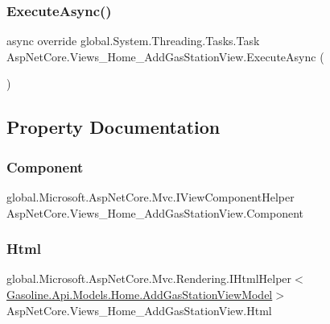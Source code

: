 \subsubsection{\texorpdfstring{ExecuteAsync()}{ExecuteAsync()}}
{\footnotesize\ttfamily async override global.\+System.\+Threading.\+Tasks.\+Task Asp\+Net\+Core.\+Views\+\_\+\+Home\+\_\+\+Add\+Gas\+Station\+View.\+Execute\+Async (\begin{DoxyParamCaption}{ }\end{DoxyParamCaption})}



\subsection{Property Documentation}
\mbox{\label{class_asp_net_core_1_1_views___home___add_gas_station_view_abbe0887258cdb2477dac740d2f7651c0}} 
\subsubsection{\texorpdfstring{Component}{Component}}
{\footnotesize\ttfamily global.\+Microsoft.\+Asp\+Net\+Core.\+Mvc.\+I\+View\+Component\+Helper Asp\+Net\+Core.\+Views\+\_\+\+Home\+\_\+\+Add\+Gas\+Station\+View.\+Component\hspace{0.3cm}{\ttfamily [get]}}

\mbox{\label{class_asp_net_core_1_1_views___home___add_gas_station_view_a0f260a4cbd790e869a427200af113a2e}} 
\subsubsection{\texorpdfstring{Html}{Html}}
{\footnotesize\ttfamily global.\+Microsoft.\+Asp\+Net\+Core.\+Mvc.\+Rendering.\+I\+Html\+Helper$<$\mbox{\hyperlink{class_gasoline_1_1_api_1_1_models_1_1_home_1_1_add_gas_station_view_model}{Gasoline.\+Api.\+Models.\+Home.\+Add\+Gas\+Station\+View\+Model}}$>$ Asp\+Net\+Core.\+Views\+\_\+\+Home\+\_\+\+Add\+Gas\+Station\+View.\+Html\hspace{0.3cm}{\ttfamily [get]}}

